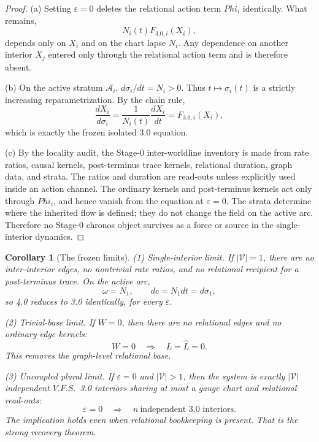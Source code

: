 \documentclass[11pt,a4paper]{article}
\def\Phi{Phi}%
\def\mathfrak#1{#1}%
\def\mathrm#1{#1}%
\def\emph#1{#1}%
\newcommand{\VFS}{\ensuremath{\mathrm{V.F.S.}}}
\theoremstyle{definition}
\theoremstyle{plain}
\newtheorem{corollary}[definition]{Corollary}
\theoremstyle{remark}
\begin{document}
\begin{proof}
(a) Setting \(\varepsilon=0\) deletes the relational action term \(\Phi_i\)
identically. What remains,
\[
N_i(t)F_{3.0,i}(X_i),
\]
depends only on \(X_i\) and on the chart lapse \(N_i\). Any dependence on another
interior \(X_j\) entered only through the relational action term and is therefore
absent.

(b) On the active stratum \(\mathcal A_i\), \(d\sigma_i/dt=N_i>0\). Thus
\(t\mapsto\sigma_i(t)\) is a strictly increasing reparametrization. By the chain
rule,
\[
\frac{dX_i}{d\sigma_i}
=
\frac{1}{N_i(t)}\frac{dX_i}{dt}
=
F_{3.0,i}(X_i),
\]
which is exactly the frozen isolated 3.0 equation.

(c) By the locality audit, the Stage-0 inter-worldline inventory is made from
rate ratios, causal kernels, post-terminus trace kernels, relational duration,
graph data, and strata. The ratios and duration are read-outs unless explicitly
used inside an action channel. The ordinary kernels and post-terminus kernels act
only through \(\Phi_i\), and hence vanish from the equation at \(\varepsilon=0\).
The strata determine where the inherited flow is defined; they do not change the
field on the active arc. Therefore no Stage-0 chronos object survives as a force
or source in the single-interior dynamics. \qedhere
\end{proof}

\begin{corollary}[The frozen limits]\label{cor:limits}
\textup{(1)} \emph{Single-interior limit.}
If \(|\mathcal V|=1\), there are no inter-interior edges, no nontrivial rate ratios,
and no relational recipient for a post-terminus trace. On the active arc,
\[
\omega=N_1,
\qquad
d\mathfrak c=N_1dt=d\sigma_1,
\]
so 4.0 reduces to 3.0 identically, for every \(\varepsilon\).

\textup{(2)} \emph{Trivial-base limit.}
If \(W=0\), then there are no relational edges and no ordinary edge kernels:
\[
W=0
\quad\Longrightarrow\quad
L=\hat L=0.
\]
This removes the graph-level relational base.

\textup{(3)} \emph{Uncoupled plural limit.}
If \(\varepsilon=0\) and \(|\mathcal V|>1\), then the system is exactly
\(|\mathcal V|\) independent \VFS\ 3.0 interiors sharing at most a gauge chart and
relational read-outs:
\[
\varepsilon=0
\quad\Longrightarrow\quad
n\ \text{independent 3.0 interiors}.
\]
The implication holds even when relational bookkeeping is present. That is the
strong recovery theorem.
\end{corollary}
\end{document}
